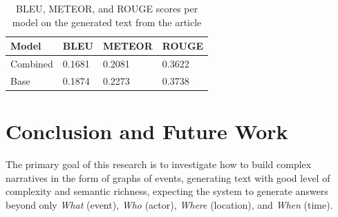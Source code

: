 \documentclass[
hf, %
]{ceurart}
\begin{document}
\begin{table}[]
\caption{BLEU, METEOR, and ROUGE scores per model on the generated text from the article}
\centering
\begin{tabular}{|l|l|l|l|}
\hline
\textbf{Model} & \textbf{BLEU} & \textbf{METEOR} & \textbf{ROUGE} \\ \hline
Combined       & 0.1681        & 0.2081          & 0.3622         \\ \hline
Base           & 0.1874        & 0.2273          & 0.3738         \\ \hline
\end{tabular}

\label{tab:article_auto_metrics}
\end{table}

\section{Conclusion and Future Work}
\label{sec:conclusion}
The primary goal of this research is to investigate how to build complex narratives in the form of graphs of events, generating text with good level of complexity and semantic richness, expecting the system to generate answers beyond only  
 \textit{What} (event), \textit{Who} (actor), \textit{Where} (location), and \textit{When} (time).
\end{document}
